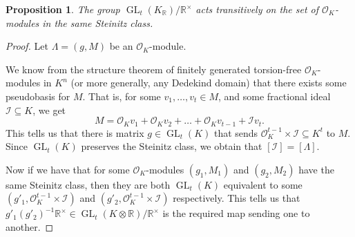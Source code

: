 \documentclass{amsart}
\newtheorem{proposition}[theorem]{Proposition}
\newcommand{\OK}{\mathcal{O}_K}
\DeclareMathOperator{\GL}{GL}
\DeclareMathOperator{\cl}{cl}
\begin{document}
\iffalse
\begin{proposition}
\label{pr:trans_action}
The group $\GL_{t}(K_\mathbb{R})/\mathbb{R}^{\times}$ acts transitively on the set of $\OK$-modules in the same Steinitz class. 
\end{proposition}
\begin{proof} 

	Let $\Lambda = (g , M)$ be an $\OK$-module. 

	We know from the structure theorem of finitely generated torsion-free $\OK$-modules in $K^{n}$
	(or more generally, any Dedekind domain) that there exists some pseudobasis for $M$. That is,
	for some $v_1,\dots,v_t \in M $, and some fractional ideal $\mathcal{I}\subseteq K$,
	we get 
	\begin{equation}
	  M = \OK v_1 + \OK v_2 + \dots + \OK v_{t-1} + \mathcal{I} v_t.
	\end{equation}
	This tells us that there is matrix $g \in \GL_{t}(K)$ that sends $\OK^{t-1} \times \mathcal{I}\subseteq K^{t}$ 
	to $M$. Since $\GL_{t}(K)$ preserves the Steinitz class, 
	we obtain that $[\mathcal{I}] = [\Lambda]$.

	Now if we have that for some $\OK$-modules $(g_1, M_1)$ and $(g_2,M_2)$ have the same Steinitz class, then they are both $\GL_{t}(K)$ equivalent to some 
	$(g'_1, \OK^{t-1} \times \mathcal{I})$ and
	$(g'_2, \OK^{t-1} \times \mathcal{I})$ respectively. 
	This tells us that $g'_1 ( g'_2 )^{-1} \mathbb{R}^{\times} \in \GL_{t}(K \otimes \mathbb{R})/\mathbb{R}^{\times}$ is the required map sending one to another. 

	
	
\end{proof}
\end{document}
